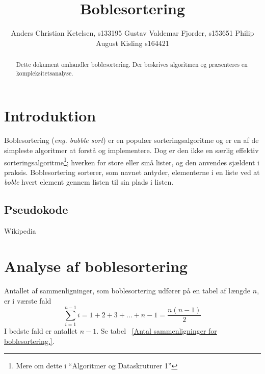 \documentclass[12pt,a4paper]{article}
\author{Anders Christian Ketelsen, s133195 Gustav Valdemar Fjorder, s153651 Philip August Kisling s164421}
\title{Boblesortering}
\begin{document}
\maketitle
\begin{abstract}
Dette dokument omhandler boblesortering. Der beskrives algoritmen og præsenteres en kompleksitetsanalyse.
\end{abstract}
\section{Introduktion}
Boblesortering (\textsl{eng. bubble sort}) er en populær sorteringsalgoritme og er en af de simpleste algoritmer at forstå og implementere. Dog er den ikke en særlig effektiv sorteringsalgoritme\footnote{Mere om dette i ``Algoritmer og Dataskruturer 1''}; hverken for store eller små lister, og den anvendes sjældent i praksis. Boblesortering sorterer, som navnet antyder, elementerne i en liste ved at \textsl{boble} hvert element gennem listen til sin plads i listen.


\subsection{Pseudokode}
Wikipedia 

\section{Analyse af boblesortering}
Antallet af sammenligninger, som boblesortering udfører på en tabel af længde $n$, er i værste fald
\[\sum_{i=1}^{n-1}i=1+2+3+...+n-1=\frac{n(n-1)}{2}\]
I bedste fald er antallet $n-1$. Se tabel ~\ref{Antal sammenligninger for boblesortering.}.
\end{document}
